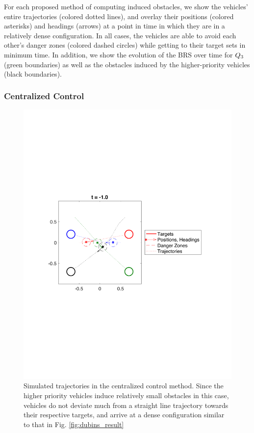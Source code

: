 For each proposed method of computing induced obstacles, we show the vehicles' entire trajectories (colored dotted lines), and overlay their positions (colored asterisks) and headings (arrows) at a point in time in which they are in a relatively dense configuration. In all cases, the vehicles are able to avoid each other's danger zones (colored dashed circles) while getting to their target sets in minimum time. In addition, we show the evolution of the BRS over time for $Q_3$ (green boundaries) as well as the obstacles induced by the higher-priority vehicles (black boundaries).

\subsubsection{Centralized Control}
\begin{figure}
  \centering
  \includegraphics[width=\columnwidth]{"fig/cc_traj"}
  \caption{Simulated trajectories in the centralized control method. Since the higher priority vehicles induce relatively small obstacles in this case, vehicles do not deviate much from a straight line trajectory towards their respective targets, and arrive at a dense configuration similar to that in Fig. \ref{fig:dubins_result}}
  \label{fig:cc_traj}
\end{figure}

